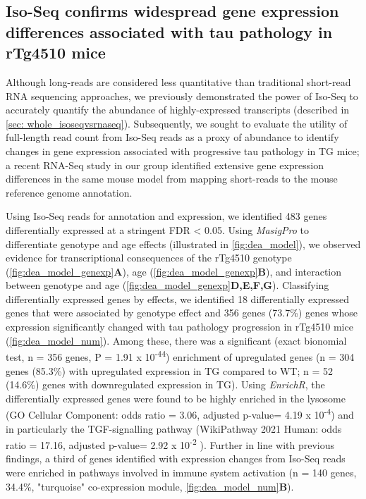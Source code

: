 \subsection{Iso-Seq confirms widespread gene expression differences associated with tau pathology in rTg4510 mice}
\label{ch5: diffgeneexp}
Although long-reads are considered less quantitative than traditional short-read RNA sequencing approaches, we previously demonstrated the power of Iso-Seq to accurately quantify the abundance of highly-expressed transcripts (described in \cref{sec: whole_isoseqvsrnaseq}). Subsequently, we sought to evaluate the utility of full-length read count from Iso-Seq reads as a proxy of abundance to identify changes in gene expression associated with progressive tau pathology in TG mice; a recent RNA-Seq study in our group  identified extensive gene expression differences in the same mouse model from mapping short-reads to the mouse reference genome annotation\cite{Castanho2020}.

Using Iso-Seq reads for annotation and expression, we identified 483 genes differentially expressed at a stringent FDR < 0.05. Using \textit{MasigPro} to differentiate genotype and age effects (illustrated in \cref{fig:dea_model}), we observed evidence for transcriptional consequences of the rTg4510 genotype (\cref{fig:dea_model_genexp}\textbf{A}), age (\cref{fig:dea_model_genexp}\textbf{B}), and interaction between genotype and age (\cref{fig:dea_model_genexp}\textbf{D,E,F,G}). Classifying differentially expressed genes by effects, we identified 18 differentially expressed genes that were associated by genotype effect and 356 genes (73.7\%) genes whose expression significantly changed with tau pathology progression in rTg4510 mice (\cref{fig:dea_model_num}). Among these, there was a significant (exact bionomial test, n = 356 genes, P = 1.91 x 10\textsuperscript{-44}) enrichment of upregulated genes (n = 304 genes (85.3\%) with upregulated expression in TG compared to WT; n = 52 (14.6\%) genes with downregulated expression in TG). Using \textit{EnrichR}, the differentially expressed genes were found to be highly enriched in the lysosome (GO Cellular Component: odds ratio = 3.06, adjusted p-value= 4.19 x 10\textsuperscript{-4}) and in particularly the TGF-\textbeta signalling pathway (WikiPathway 2021 Human: odds ratio = 17.16, adjusted p-value= 2.92 x 10\textsuperscript{-2} ). Further in line with previous findings, a third of genes identified with expression changes from Iso-Seq reads were enriched in pathways involved in immune system activation (n = 140 genes, 34.4\%, "turquoise" co-expression module\cite{Castanho2020}, \cref{fig:dea_model_num}\textbf{B}). 

